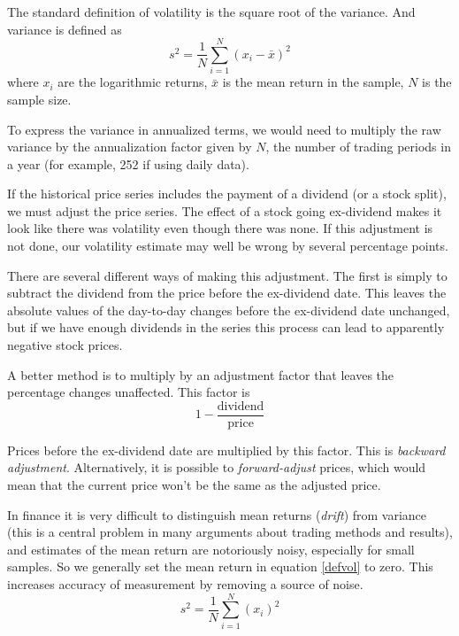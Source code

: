 \documentclass[11pt]{report}
\begin{document}
		The standard definition of volatility is the square root of the variance. And variance is defined as
		\begin{equation}
			s^2 = \frac{1}{N} \sum_{i=1}^N (x_i - \bar{x})^2
			\label{defvol}
		\end{equation}
		where $x_i$ are the logarithmic returns, $\bar{x}$ is the mean return in the sample, $N$ is the sample size.

		To express the variance in annualized terms, we would need to multiply the raw variance by the annualization factor given by $N$, the number of trading periods in a year (for example, 252 if using daily data).

		If the historical price series includes the payment of a dividend (or a stock split), we must adjust the price series. The effect of a stock going ex-dividend makes it look like there was volatility even though there was none. If this adjustment is not done, our volatility estimate may well be wrong by several percentage points. 

		There are several different ways of making this adjustment. The first is simply to subtract the dividend from the price before the ex-dividend date. This leaves the absolute values of the day-to-day changes before the ex-dividend date unchanged, but if we have enough dividends in the series this process can lead to apparently negative stock prices.

		A better method is to multiply by an adjustment factor that leaves the percentage changes unaffected. This factor is
		\begin{equation}
			1 - \frac{\text{dividend}}{\text{price}}
		\end{equation}

		Prices before the ex-dividend date are multiplied by this factor. This is \textit{backward adjustment}. Alternatively, it is possible to \textit{forward-adjust} prices, which would mean that the current price won’t be the same as the adjusted price.

		In finance it is very difficult to distinguish mean returns (\textit{drift}) from variance (this is a central problem in many arguments about trading methods and results), and estimates of the mean return are notoriously noisy, especially for small samples. So we generally set the mean return in equation \eqref{defvol} to zero. This increases accuracy of measurement by removing a source of noise.
		\begin{equation}
			s^2 = \frac{1}{N} \sum_{i=1}^N (x_i)^2
			\label{defvol-no_drift}
		\end{equation}
\end{document}
